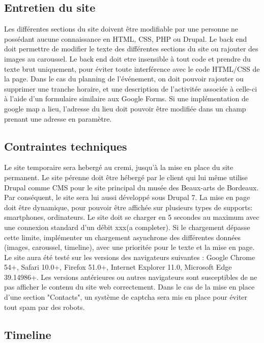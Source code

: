 \documentclass[12pt]{article}
\begin{document}
\subsection*{Entretien du site}

Les différentes sections du site doivent être modifiable par une personne ne possédant aucune connaissance en HTML, CSS, PHP ou Drupal. Le back end doit permettre de modifier le texte des différentes sections du site ou rajouter des images au caroussel. Le back end doit etre insensible à tout code et prendre du texte brut uniquement, pour éviter toute interférence avec le code HTML/CSS de la page. Dans le cas du planning de l'événement, on doit pouvoir rajouter ou supprimer une tranche horaire, et une description de l'activitée associée à celle-ci à l'aide d'un formulaire similaire aux Google Forms. Si une implémentation de google map a lieu, l'adresse du lieu doit pouvoir être modifiée dans un champ prenant une adresse en paramètre.

\subsection*{Contraintes techniques}

Le site temporaire sera hebergé au cremi, jusqu'à la mise en place du site permanent.
Le site pérenne doit être hébergé par le client qui lui même utilise Drupal comme CMS pour le site principal du musée des Beaux-arts de Bordeaux. Par conséq\-uent, le site sera lui aussi développé sous Drupal 7. La mise en page doit être dynamique, pour pouvoir être affichée sur plusieurs types de supports: smartphones, ordinateurs. Le site doit se charger en 5 secondes au maximum avec une connexion standard d'un débit xxx(a completer). Si le chargement dépasse cette limite, implémenter un chargement asynchrone des différentes données (images, caroussel, timeline), avec une prioritée pour le texte et la mise en page. Le site aura été testé sur les versions des navigateurs suivantes : Google Chrome 54+, Safari 10.0+, Firefox 51.0+, Internet Explorer 11.0, Microsoft Edge 39.14986+. Les versions antérieures ou autres navigateurs sont susceptibles de ne pas afficher le contenu du site web correctement. Dans le cas de la mise en place d'une section "Contacts", un système de captcha sera mis en place pour éviter tout spam par des robots.

\subsection*{Timeline}
\end{document}
